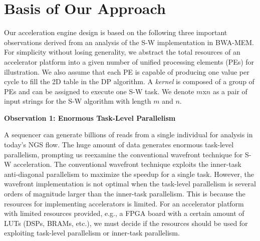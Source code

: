 \section{Basis of Our Approach}
\label{sec:approach}

Our acceleration engine design is based on the following three important observations 
derived from an analysis of the S-W implementation in BWA-MEM.
For simplicity without losing generality, 
we abstract the total resources of an accelerator platform into a given number of unified processing elements (PEs) for illustration. 
We also assume that each PE is capable of producing one value per cycle to fill the 2D table in the DP algorithm. 
A \textit{kernel} is composed of a group of PEs and can be assigned to execute one S-W task.
We denote $m$x$n$ as a pair of input strings for the S-W algorithm with length $m$ and $n$. 

\vspace{1pt}
\textbf{Observation 1: Enormous Task-Level Parallelism}
\vspace{1pt}

A sequencer can generate billions of reads from a single individual for analysis in today's NGS flow.
The huge amount of data generates enormous task-level parallelism, prompting us reexamine the conventional wavefront technique for S-W acceleration.
The conventional wavefront technique exploits the inner-task anti-diagonal parallelism to maximize the speedup for a single task.
However, the wavefront implementation is not optimal when the task-level parallelism is several orders of magnitude larger than the inner-task parallelism.
This is because the resources for implementing accelerators is limited.
For an accelerator platform with limited resources provided, e.g., a FPGA board with a certain amount of LUTs (DSPs, BRAMs, etc.), we must decide if the resources should be used for exploiting task-level parallelism or inner-task parallelism.

